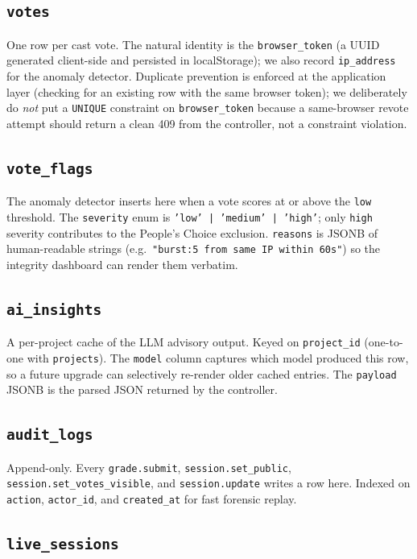 \subsection{\texttt{votes}}

One row per cast vote. The natural identity is the
\texttt{browser\_token} (a UUID generated client-side and persisted in
localStorage); we also record \texttt{ip\_address} for the anomaly
detector. Duplicate prevention is enforced at the application layer
(checking for an existing row with the same browser token); we
deliberately do \emph{not} put a \texttt{UNIQUE} constraint on
\texttt{browser\_token} because a same-browser revote attempt should
return a clean 409 from the controller, not a constraint violation.

\subsection{\texttt{vote\_flags}}

The anomaly detector inserts here when a vote scores at or above the
\texttt{low} threshold. The \texttt{severity} enum is
\texttt{'low' | 'medium' | 'high'}; only \texttt{high} severity
contributes to the People's Choice exclusion. \texttt{reasons} is JSONB
of human-readable strings (e.g.\ \texttt{"burst:5 from same IP within
60s"}) so the integrity dashboard can render them verbatim.

\subsection{\texttt{ai\_insights}}

A per-project cache of the LLM advisory output. Keyed on
\texttt{project\_id} (one-to-one with \texttt{projects}). The
\texttt{model} column captures which model produced this row, so a future
upgrade can selectively re-render older cached entries. The
\texttt{payload} JSONB is the parsed JSON returned by the controller.

\subsection{\texttt{audit\_logs}}

Append-only. Every \texttt{grade.submit}, \texttt{session.set\_public},
\texttt{session.set\_votes\_visible}, and \texttt{session.update} writes a
row here. Indexed on \texttt{action}, \texttt{actor\_id}, and
\texttt{created\_at} for fast forensic replay.

\subsection{\texttt{live\_sessions}}


